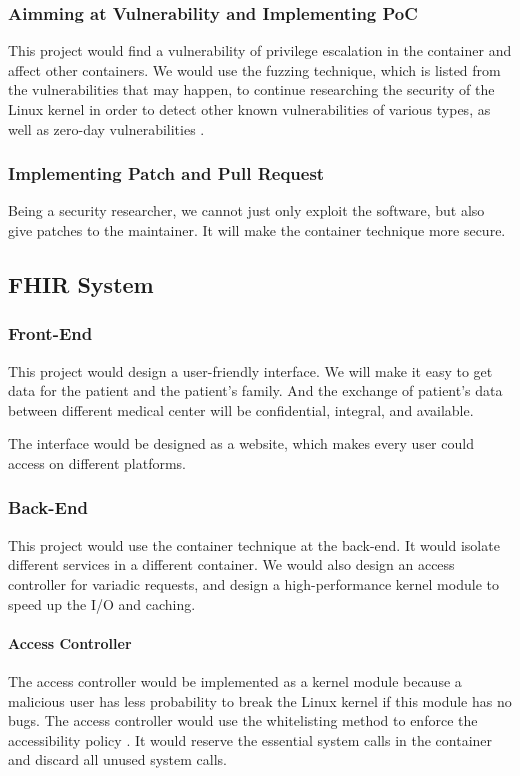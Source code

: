 \documentclass[12pt,a4paper]{article}
\begin{document}
\subsubsection{Aimming at Vulnerability and Implementing PoC}
This project would find a vulnerability of privilege escalation in the container and affect
other containers. We would use the fuzzing technique, which is listed from the vulnerabilities
that may happen, to continue researching the security of the Linux kernel in order to detect
other known vulnerabilities of various types, as well as zero-day vulnerabilities \cite{Fuzzing}.

\subsubsection{Implementing Patch and Pull Request}
Being a security researcher, we cannot just only exploit the software, but also give patches to
the maintainer. It will make the container technique more secure.

\subsection{FHIR System}
\subsubsection{Front-End}
This project would design a user-friendly interface. We will make it easy to get data for the
patient and the patient's family. And the exchange of patient's data between different
medical center will be confidential, integral, and available.

The interface would be designed as a website, which makes every user could access on different
platforms.

\subsubsection{Back-End}
This project would use the container technique at the back-end. It would isolate different
services in a different container. We would also design an access controller for variadic
requests, and design a high-performance kernel module to speed up the I/O and caching.

\paragraph{Access Controller}
The access controller would be implemented as a kernel module because a malicious user has
less probability to break the Linux kernel if this module has no bugs.
The access controller would use the whitelisting method to enforce the accessibility policy
\cite{Access_Control_Architecture}.
It would reserve the essential system calls in the container and discard all unused system calls.
\end{document}
